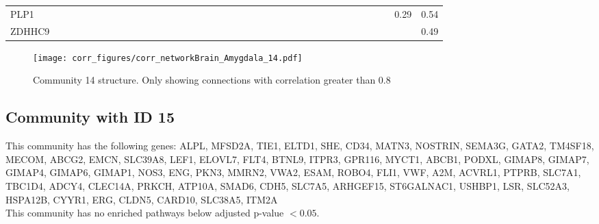 \begin{longtable}{lrrrrrrrrrrrrrrrrrrrrrrrrrrrrrrrrrrrrr}
PLP1    &              &             &               &               &             &             &           &          &              &              &            &            &           &             &             &             &             &              &             &               &              &             &               &               &             &            &             &           &             &            &           &            &            &            &            &         0.29 &       0.54 \\
ZDHHC9  &              &             &               &               &             &             &           &          &              &              &            &            &           &             &             &             &             &              &             &               &              &             &               &               &             &            &             &           &             &            &           &            &            &            &            &              &       0.49 \\
\end{longtable}


\begin{figure}[h!]
\centering
\texttt{[image: corr\_figures/corr\_networkBrain\_Amygdala\_14.pdf]}
\caption{Community 14 structure. Only showing connections with correlation greater than 0.8}
\end{figure}




\subsection*{Community with ID 15}
This community has the following genes: ALPL, MFSD2A, TIE1, ELTD1, SHE, CD34, MATN3, NOSTRIN, SEMA3G, GATA2, TM4SF18, MECOM, ABCG2, EMCN, SLC39A8, LEF1, ELOVL7, FLT4, BTNL9, ITPR3, GPR116, MYCT1, ABCB1, PODXL, GIMAP8, GIMAP7, GIMAP4, GIMAP6, GIMAP1, NOS3, ENG, PKN3, MMRN2, VWA2, ESAM, ROBO4, FLI1, VWF, A2M, ACVRL1, PTPRB, SLC7A1, TBC1D4, ADCY4, CLEC14A, PRKCH, ATP10A, SMAD6, CDH5, SLC7A5, ARHGEF15, ST6GALNAC1, USHBP1, LSR, SLC52A3, HSPA12B, CYYR1, ERG, CLDN5, CARD10, SLC38A5, ITM2A
\\
This community has no enriched pathways below adjusted p-value $< 0.05$.

